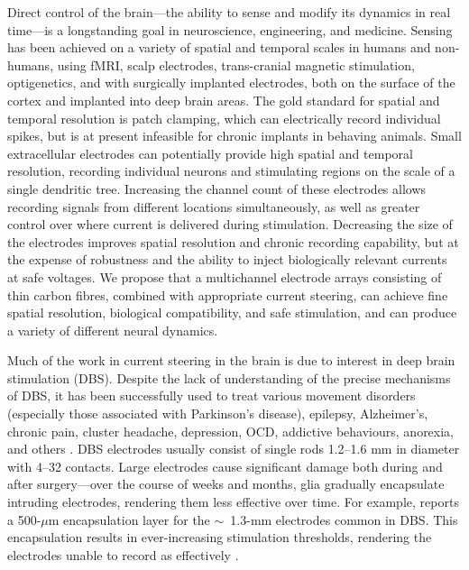 \documentclass[10pt,letterpaper]{article}
\begin{document}
Direct control of the brain---the ability to sense and modify its
dynamics in real time---is a longstanding goal in neuroscience,
engineering, and medicine. Sensing has been achieved on a variety of
spatial and temporal scales in humans and non-humans, using fMRI,
scalp electrodes, trans-cranial magnetic stimulation,
optigenetics, and with surgically implanted electrodes, both on the
surface of the cortex and implanted into deep brain areas. The gold
standard for spatial and temporal resolution is patch clamping, which
can electrically record individual spikes, but is at present infeasible for
chronic implants in behaving animals. Small extracellular electrodes
can potentially provide high spatial and temporal resolution,
recording individual neurons and stimulating regions on the scale
of a single dendritic tree. Increasing the channel count of these
electrodes allows recording signals from different locations
simultaneously, as well as greater control over
where current is delivered during stimulation. Decreasing the size of the electrodes improves spatial resolution and chronic recording capability, but at the expense of robustness and the ability to inject biologically relevant currents at safe voltages. We propose that a multichannel electrode
arrays consisting of thin carbon fibres, combined with appropriate
current steering, can achieve fine spatial resolution, biological
compatibility, and safe stimulation, and can produce a variety of different
neural dynamics.

Much of the work in current steering in the brain is due to interest
in deep brain stimulation (DBS).  Despite the lack of understanding of
the precise mechanisms of DBS, it has been successfully used to treat
various movement disorders (especially those associated with
Parkinson's disease), epilepsy, Alzheimer's, chronic pain, cluster
headache, depression, OCD, addictive behaviours, anorexia, and others
\cite{Udupa2015dbs}. DBS electrodes usually consist of single rods
1.2--1.6 mm in diameter with 4--32 contacts. Large electrodes cause
significant damage both during and after surgery---over the course of
weeks and months, glia gradually encapsulate intruding electrodes,
rendering them less effective over time. For example,
\cite{Butson2008steering} reports a 500-$\mu$m encapsulation layer for
the $\sim$~1.3-mm electrodes common in DBS.  This encapsulation
results in ever-increasing stimulation thresholds, rendering the
electrodes unable to record as effectively
\cite{Barrese2016electrodestability,Biran2005gliosis,Polikov2005gliosis,Winslow2010gliosis}.
\end{document}
